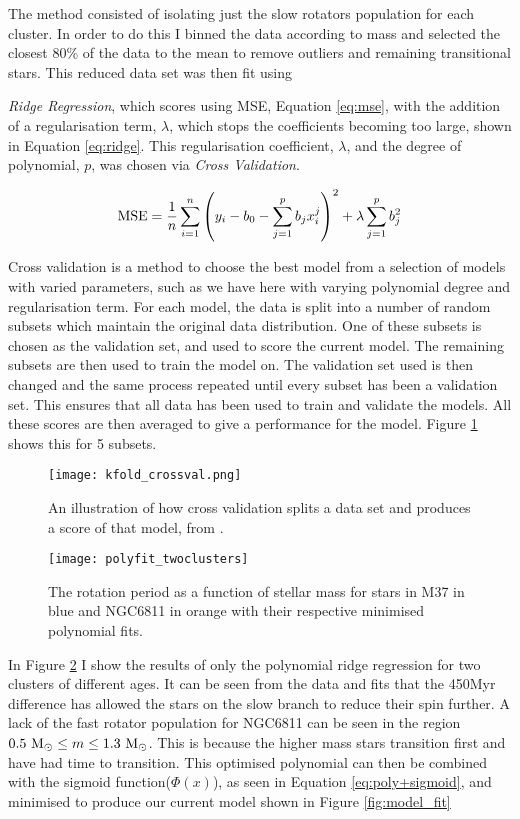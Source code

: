 \documentclass[fleqn,usenatbib]{mnras}
\begin{document}
The method consisted of isolating just the slow rotators population for each cluster.
In order to do this I binned the data according to mass and selected the closest 80\% of the data to the mean to remove outliers and remaining transitional stars.
This reduced data set was then fit using {\textit{Ridge Regression}, which scores using MSE, Equation \ref{eq:mse}, with the addition of a regularisation term, $\lambda$, which stops the coefficients becoming too large, shown in Equation \ref{eq:ridge}.
This regularisation coefficient, $\lambda$, and the degree of polynomial, $p$, was chosen via \textit{Cross Validation}.

\begin{equation}
	\label{eq:ridge}
	\textup{MSE} = \frac{1}{n}\sum_{i = 1}^n \left(y_i - b_0 - \sum_{j = 1}^p b_jx_i^j \right)^2 + \lambda \sum_{j = 1}^p b^2_j
\end{equation}

Cross validation is a method to choose the best model from a selection of models with varied parameters, such as we have here with varying polynomial degree and regularisation term.
For each model, the data is split into a number of random subsets which maintain the original data distribution.
One of these subsets is chosen as the validation set, and used to score the current model.
The remaining subsets are then used to train the model on.
The validation set used is then changed and the same process repeated until every subset has been a validation set.
This ensures that all data has been used to train and validate the models.
All these scores are then averaged to give a performance for the model.
Figure \ref{fig:cross_validation} shows this for 5 subsets.

\begin{figure}
	\texttt{[image: kfold\_crossval.png]}
	\caption{An illustration of how cross validation splits a data set and produces a score of that model, from \protect\cite{CrossVal}.}
	\label{fig:cross_validation}
\end{figure}



\begin{figure}
	\texttt{[image: polyfit\_twoclusters]}
	\caption{The rotation period as a function of stellar mass for stars in M37 in blue and NGC6811 in orange with their respective minimised polynomial fits.}
	\label{fig:polyfit_twoclusters}
\end{figure}

In Figure \ref{fig:polyfit_twoclusters} I show the results of only the polynomial ridge regression for two clusters of different ages.
It can be seen from the data and fits that the 450Myr difference has allowed the stars on the slow branch to reduce their spin further.
A lack of the fast rotator population for NGC6811 can be seen in the region $0.5~\textup{M}_\odot \leq m \leq 1.3~\textup{M}_\odot$.
This is because the higher mass stars transition first and have had time to transition.
This optimised polynomial can then be combined with the sigmoid function($\Phi\left(x\right)$), as seen in Equation \ref{eq:poly+sigmoid}, and minimised to produce our current model shown in Figure \ref{fig:model_fit}

}
\end{document}
